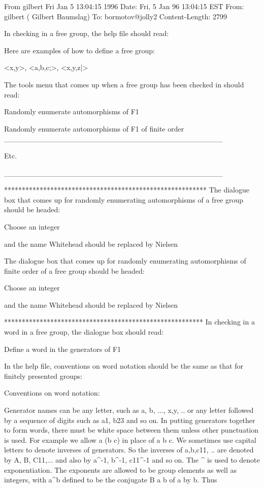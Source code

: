 From gilbert Fri Jan  5 13:04:15 1996
Date: Fri, 5 Jan 96 13:04:15 EST
From: gilbert ( Gilbert Baumslag)
To: bormotov@jolly2
Content-Length: 2799

\def\m{\medskip\noindent}

\m
In checking in a free group, the help file should read:

Here are examples of how to define a free group:

<x,y>, <a,b,c;>, <x,y,z|> 

The tools menu that comes up when a free group has been
checked in should read:

Randomly enumerate automorphisms of F1

Randomly enumerate automorphisms of F1 of finite order
_________________________________________

Etc.

_________________________________________

*********************************************************
The dialogue box that comes up for randomly  enumerating
automorphisms of a free group should be headed:

Choose an integer

and the name Whitehead should be replaced by Nielsen

The dialogue box that comes up for randomly  enumerating
automorphisms of finite order of a free group should be 
headed:

Choose an integer

and the name Whitehead should be replaced by Nielsen

********************************************************
In checking in a word in a free group, the dialogue box
should read:

Define a word in the generators of F1

In the help file, conventions on word notation should be
the same as that for finitely presented groups:

Conventions on word notation:

Generator names can be any letter, such as a, b, ...,
x,y, ..  or any letter followed by a sequence of digits
such as a1, b23 and so on. In putting generators together
to form words, there must be white space between them unless
other punctuation is used. For example we allow  a (b c) in 
place of a b c. We sometimes use capital letters to denote 
inverses of generators. So the inverses of a,b,c11, .. are 
denoted by A, B, C11,... and also by a^-1, b^-1, c11^-1 and 
so on. The ^ is used to denote exponentiation. The exponents
are allowed to be group elements as well as integers, with 
a^b defined to be the conjugate B a b of a by b. Thus

